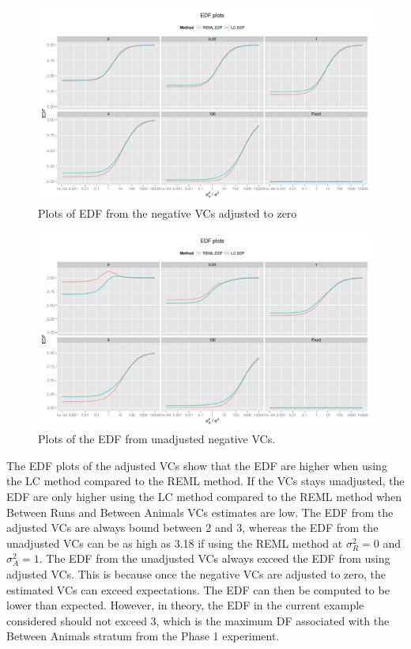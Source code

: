 \documentclass[12pt,a4paper]{article}
\begin{document}
\begin{figure}[ht]
\centering
\includegraphics[width=1 \textwidth]{Graph/CRD232Tag4.pdf}
\caption{Plots of EDF from the negative VCs adjusted to zero}
\label{fig:EDFadjusted}
\end{figure}

\begin{figure}[ht]
\centering
\includegraphics[width=1 \textwidth]{Graph/CRD232Tag4Unadjusted.pdf}
\caption{Plots of the EDF from unadjusted negative VCs.}
\label{fig:EDFunadjusted}
\end{figure}

The EDF plots of the adjusted VCs show that the EDF are higher when using the LC method compared to the REML method. If the VCs stays unadjusted, the EDF are only higher using the LC method compared to the REML method when Between Runs and Between Animals VCs estimates are low. The EDF from the adjusted VCs are always bound between 2 and 3, whereas the EDF from the unadjusted VCs can be as high as 3.18 if using the REML method at $\sigma^2_R = 0$ and $\sigma^2_A = 1$. The EDF from the unadjusted VCs always exceed the EDF from using adjusted VCs. This is because once the negative VCs are adjusted to zero, the estimated VCs can exceed expectations. The EDF can then be computed to be lower than expected. However, in theory, the EDF in the current example considered should not exceed 3, which is the maximum DF associated with the Between Animals stratum from the Phase 1 experiment. 
\end{document}
